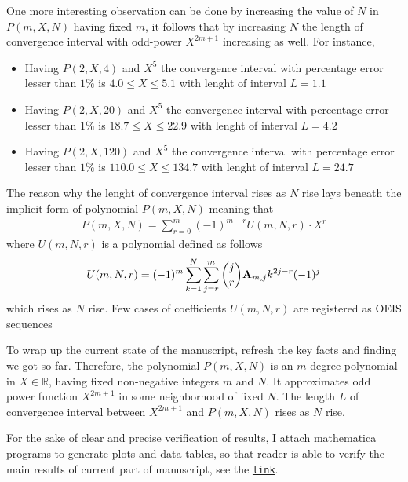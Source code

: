 One more interesting observation can be done by increasing the value of $N$ in $P(m, X, N)$ having fixed $m$, it
follows that by increasing $N$ the length of convergence interval with odd-power $X^{2m+1}$ increasing as well.
For instance,
\begin{itemize}
    \item Having $P(2, X, 4)$ and $X^5$ the convergence interval with percentage error lesser than $1\%$ is $4.0 \leq X \leq 5.1$ with lenght of interval $L=1.1$
    \item Having $P(2, X, 20)$ and $X^5$ the convergence interval with percentage error lesser than $1\%$ is $18.7 \leq X \leq 22.9$ with lenght of interval $L=4.2$
    \item Having $P(2, X, 120)$ and $X^5$ the convergence interval with percentage error lesser than $1\%$ is $110.0 \leq X \leq 134.7$ with lenght of interval $L=24.7$
\end{itemize}
The reason why the lenght of convergence interval rises as $N$ rise lays beneath the implicit form of polynomial $P(m,X,N)$
meaning that
\begin{align*}
    P(m,X,N) = \sum_{r=0}^{m} (-1)^{m-r} U(m, N, r) \cdot X^{r}
\end{align*}
where $U(m, N, r)$ is a polynomial defined as follows
\begin{align*}
    U(m, N, r) = (-1)^m \sum_{k=1}^{N} \sum_{j=r}^{m} \binom{j}{r} {\mathbf{A}} \sb{m,j} k^{2j-r} (-1)^j
\end{align*}
which rises as $N$ rise.
Few cases of coefficients $U(m, N, r)$ are registered as OEIS sequences~\cite{
    oeis_coefficients_u_m_l_k_defined_by_polynomial_identity_1,
    oeis_coefficients_u_m_l_k_defined_by_polynomial_identity_2,
    oeis_coefficients_u_m_l_k_defined_by_polynomial_identity_3}

To wrap up the current state of the manuscript, refresh the key facts and finding we got so far.
Therefore, the polynomial $P(m,X,N)$ is an $m$-degree polynomial in $X \in \mathbb{R}$, having fixed non-negative
integers $m$ and $N$.
It approximates odd power function $X^{2m+1}$ in some neighborhood of fixed $N$.
The length $L$ of convergence interval between $X^{2m+1}$ and $P(m,X,N)$ rises as $N$ rise.

For the sake of clear and precise verification of results, I attach mathematica programs to generate
plots and data tables, so that reader is able to verify the main results of current part of manuscript,
see the \href{https://gist.github.com/kolosovpetro/2b5c55094c66b8d6a97b9798be9a8dec}{\texttt{link}}.


